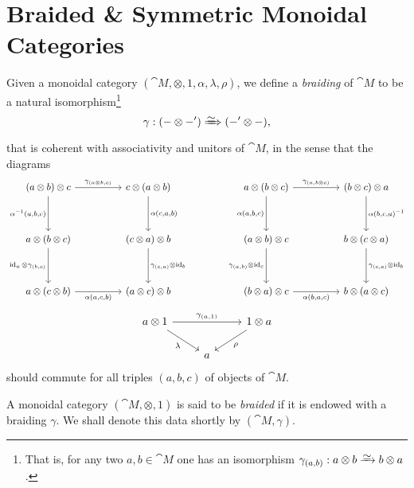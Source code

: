 \documentclass[../../deep-dive]{subfiles}
\begin{document}
\section{Braided \& Symmetric Monoidal Categories}

\begin{definition}[Braiding]
\label{def:braiding}
Given a monoidal category \((\cat M, \otimes, 1, \alpha, \lambda, \rho)\), we
define a \emph{braiding} of \(\cat M\) to be a natural isomorphism\footnote{That
  is, for any two \(a, b \in \cat M\) one has an isomorphism
  \(\gamma_{(a, b)}: a \otimes b \isoto b \otimes a\).}
\[
\gamma: (- \otimes -') \isonat (-' \otimes -),
\]
that is coherent with associativity and unitors of \(\cat M\), in the sense that
the diagrams
\[
\begin{tikzcd}
(a \otimes b) \otimes c
\ar[rr, "\gamma_{(a \otimes b, c)}"]
\ar[dd, "{\alpha^{-1}(a, b, c)}"']
&&c \otimes (a \otimes b)
\ar[dd, "{\alpha(c, a, b)}"]
\\
&&
\\
a \otimes (b \otimes c)
\ar[dd, "\Id_a \otimes \gamma_{(b, c)}"']
&&(c \otimes a) \otimes b
\ar[dd, "\gamma_{(c, a)} \otimes \Id_b"]
\\
&&
\\
a \otimes (c \otimes b)
\ar[rr, "\alpha{(a, c, b)}"']
&&(a \otimes c) \otimes b
\end{tikzcd}
\qquad
\qquad
\begin{tikzcd}
a \otimes (b \otimes c)
\ar[rr, "\gamma_{(a, b \otimes c)}"]
\ar[dd, "{\alpha(a, b, c)}"']
&&(b \otimes c) \otimes a
\ar[dd, "{\alpha(b, c, a)^{-1}}"]
\\
&&
\\
(a \otimes b) \otimes c
\ar[dd, "\gamma_{(a, b)} \otimes \Id_c"']
&&b \otimes (c \otimes a)
\ar[dd, "\gamma_{(c, a)} \otimes \Id_b"]
\\
&&
\\
(b \otimes a) \otimes c
\ar[rr, "\alpha{(b, a, c)}"']
&&b \otimes (a \otimes c)
\end{tikzcd}
\]
\[
\begin{tikzcd}
a \otimes 1 \ar[rr, "\gamma_{(a, 1)}"]
\ar[rd, "\lambda"']
&&1 \otimes a \ar[ld, "\rho"]
\\
&a &
\end{tikzcd}
\]
should commute for all triples \((a, b, c)\) of objects of \(\cat M\).
\end{definition}

\begin{definition}
\label{def:braided-monoidal-category}
A monoidal category \((\cat M, \otimes, 1)\) is said to be \emph{braided} if it
is endowed with a braiding \(\gamma\). We shall denote this data shortly by
\((\cat M, \gamma)\).
\end{definition}
\end{document}
